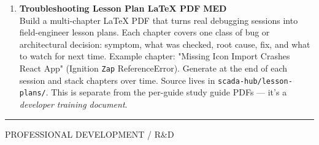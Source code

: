 \documentclass[10pt]{article}
\newcommand{\med}{\textcolor{samber}{\small\bfseries MED}}
\begin{document}
\begin{enumerate}[resume]
  \item \textbf{Troubleshooting Lesson Plan LaTeX PDF} \hfill \med \\
    Build a multi-chapter LaTeX PDF that turns real debugging sessions into field-engineer lesson plans. Each chapter covers one class of bug or architectural decision: symptom, what was checked, root cause, fix, and what to watch for next time. Example chapter: "Missing Icon Import Crashes React App" (Ignition \texttt{Zap} ReferenceError). Generate at the end of each session and stack chapters over time. Source lives in \texttt{scada-hub/lesson-plans/}. This is separate from the per-guide study guide PDFs — it's a \emph{developer training document}.
\end{enumerate}

\smallskip
{\color{snavy}\rule{\linewidth}{0.4pt}}
\smallskip

{\small\sffamily\color{sgray}\MakeUppercase{Professional Development / R\&D}}
\smallskip
\end{document}

